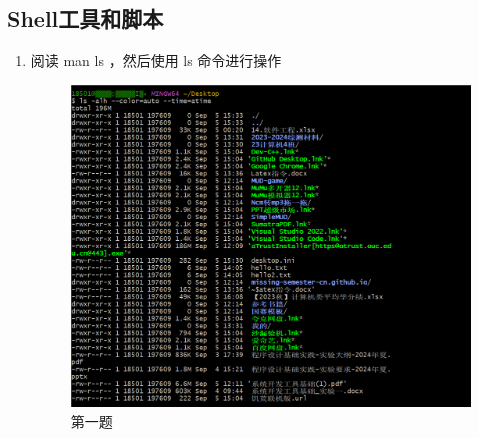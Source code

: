 \documentclass{ctexart}
\begin{document}
\subsection{Shell工具和脚本}
\begin{enumerate}

    \item 阅读 man ls ，然后使用 ls 命令进行操作
    \begin{figure}[H]
        \centering
        \includegraphics[width=14cm]{e96ab6acaa1341245480329c26f00d25.png}
        \caption{第一题}
        \label{fig:1}
    \end{figure}
 

\end{enumerate}
\end{document}

